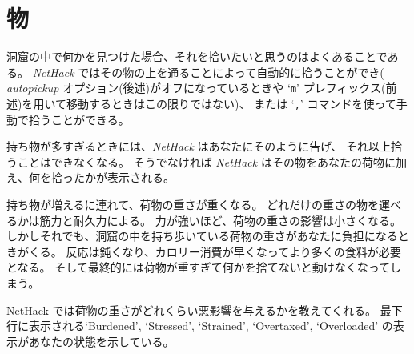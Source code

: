 \section{物}

洞窟の中で何かを見つけた場合、それを拾いたいと思うのはよくあることである。
{\it NetHack\/} ではその物の上を通ることによって自動的に拾うことができ(
{\it autopickup\/} オプション(後述)がオフになっているときや
`{\tt m}' プレフィックス(前述)を用いて移動するときはこの限りではない)、
または `{\tt ,}' コマンドを使って手動で拾うことができる。

持ち物が多すぎるときには、{\it NetHack\/} はあなたにそのように告げ、
それ以上拾うことはできなくなる。
そうでなければ {\it NetHack\/} はその物をあなたの荷物に加え、何を拾ったかが表示される。

持ち物が増えるに連れて、荷物の重さが重くなる。
どれだけの重さの物を運べるかは筋力と耐久力による。
力が強いほど、荷物の重さの影響は小さくなる。
しかしそれでも、洞窟の中を持ち歩いている荷物の重さがあなたに負担になるときがくる。
反応は鈍くなり、カロリー消費が早くなってより多くの食料が必要となる。
そして最終的には荷物が重すぎて何かを捨てないと動けなくなってしまう。

NetHack では荷物の重さがどれくらい悪影響を与えるかを教えてくれる。
最下行に表示される`Burdened', `Stressed', `Strained', `Overtaxed', `Overloaded'
の表示があなたの状態を示している。

